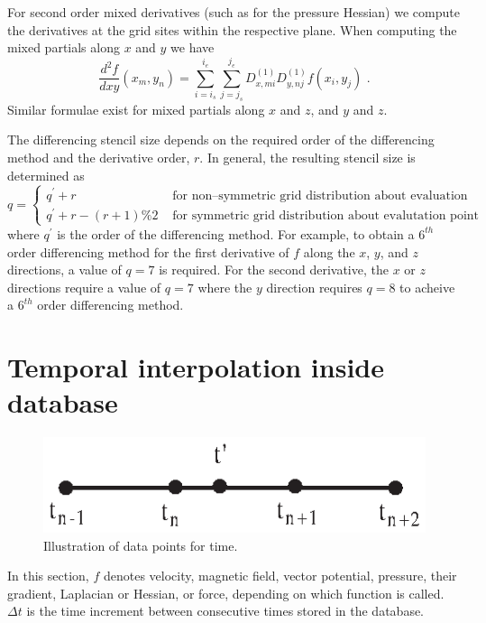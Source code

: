 \documentclass[11pt]{article}
\begin{document}
For second order mixed derivatives (such as for the pressure Hessian) we compute the derivatives at the grid sites within the respective plane. When computing the mixed partials along $x$ and $y$ we have
\begin{equation}
\frac{d^2f}{dxy}(x_m,y_n) = \sum_{i=i_s}^{i_e} \sum_{j=j_s}^{j_e} D^{(1)}_{x,mi} D^{(1)}_{y,nj} f(x_i,y_j) \textbf{ .}
\end{equation}
Similar formulae exist for mixed partials along $x$ and $z$, and $y$ and $z$. 

The differencing stencil size depends on the required order of the differencing method and the derivative order, $r$. In general, the resulting stencil size is determined as
\begin{equation}
q = 
\begin{cases}
  q^\prime + r & \text{ for non--symmetric grid distribution about evaluation point} \\
  q^\prime +r-(r+1)\%2 & \text{ for symmetric grid distribution about evalutation point} 
\end{cases}
\end{equation}
where $q^\prime$ is the order of the differencing method. For example, to obtain a $6^{th}$ order differencing method for the first derivative of $f$ along the $x$, $y$, and $z$ directions, a value of $q=7$ is required. For the second derivative, the $x$ or $z$ directions require a value of $q=7$ where the $y$ direction requires $q=8$ to acheive a $6^{th}$ order differencing method.

\section{Temporal interpolation inside database}
\label{sec:tem}
\begin{figure}[h]
\begin{minipage}{\linewidth}
\centering\includegraphics[width=0.5\linewidth]{PCHIP.eps}
\end{minipage} \caption{Illustration of data points for time.}\label{PCHIP}
\end{figure}

In this section, $f$ denotes velocity, magnetic field, vector potential, pressure,
their gradient, Laplacian or Hessian, or force, depending on which function is called. $\Delta t$ is
the time increment between consecutive times stored in the database.
\end{document}
